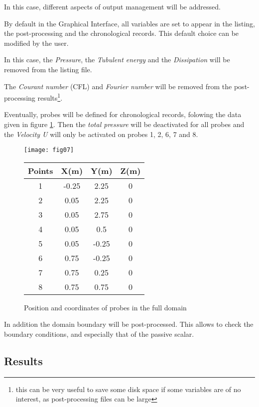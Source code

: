 In this case, different aspects of output management will be addressed.

By default in the Graphical Interface, all variables are set to appear in the
listing, the post-processing and the chronological records. This default choice
can be modified by the user.

In this case, the {\itshape Pressure}, the {\itshape Tubulent energy} and the
{\itshape Dissipation} will be removed from the listing file.

The {\itshape Courant number} (CFL) and {\itshape Fourier number} will be
removed from the
post-processing results\footnote{this can be very useful to save some disk space
if some variables are of no interest, as post-processing files can be large}.

Eventually, probes will be defined for chronological records, folowing the data
given in figure \ref{figante25}. Then the {\itshape total pressure} will be
deactivated for all probes and the {\itshape Velocity U} will only be activated
on probes  1, 2, 6, 7 and 8.

\begin{figure}[htp]
\parbox{8cm}{%
\centerline{\texttt{[image: fig07]}}}
\parbox{7cm}{%
\begin{center}
\begin{tabular}{|c|c|c|c|}
\hline
Points & X(m) & Y(m) & Z(m)\\
\hline
1 & -0.25 & 2.25 & 0 \\
\hline
2 & 0.05 & 2.25 & 0 \\
\hline
3 & 0.05 & 2.75 & 0 \\
\hline
4 & 0.05 & 0.5 & 0 \\
\hline
5 & 0.05 & -0.25 & 0 \\
\hline
6 & 0.75 & -0.25 & 0 \\
\hline
7 & 0.75 & 0.25 & 0 \\
\hline
8 & 0.75 & 0.75 & 0 \\
\hline
\end{tabular}
\end{center}
}
\caption{Position and coordinates of probes in the full domain}
\label{figante25}
\end{figure}

In addition the domain boundary will be post-processed. This allows to check the
boundary conditions, and especially that of the passive scalar.


        \subsection{Results}

